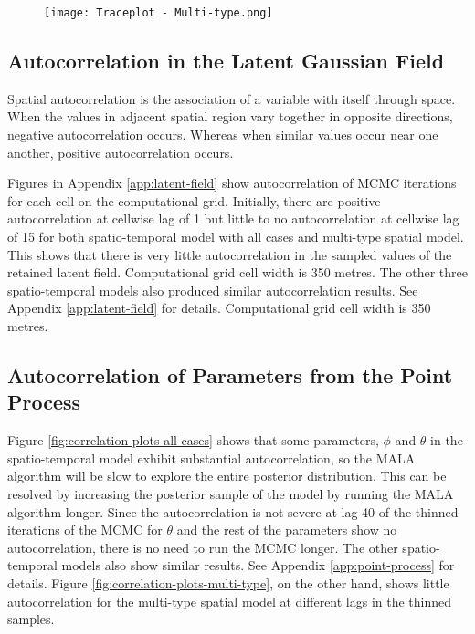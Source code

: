 \begin{figure}[H]
    \begin{center}
        \texttt{[image: Traceplot - Multi-type.png]}
    \end{center}
     \label{fig:trace-plots-multi-type}
\end{figure}

\subsection{Autocorrelation in the Latent Gaussian Field}

Spatial autocorrelation is the association of a variable with itself through space. When the values in adjacent spatial region vary together in opposite directions, negative autocorrelation occurs. Whereas when similar values occur near one another, positive autocorrelation occurs.

Figures in Appendix \ref{app:latent-field} show autocorrelation of MCMC iterations for each cell on the computational grid. Initially, there are positive autocorrelation at cellwise lag of 1 but little to no autocorrelation at cellwise lag of 15 for both spatio-temporal model with all cases and multi-type spatial model. This shows that there is very little autocorrelation in the sampled values of the retained latent field. Computational grid cell width is 350 metres. The other three spatio-temporal models also produced similar autocorrelation results. See Appendix \ref{app:latent-field} for details. Computational grid cell width is 350 metres.

\subsection{Autocorrelation of Parameters from the Point Process}

Figure \ref{fig:correlation-plots-all-cases} shows that some parameters, $\phi$ and $\theta$ in the spatio-temporal model exhibit substantial autocorrelation, so the MALA algorithm will be slow to explore the entire posterior distribution. This can be resolved by increasing the posterior sample of the model by running the MALA algorithm longer. Since the autocorrelation is not severe at lag 40 of the thinned iterations of the MCMC for $\theta$ and the rest of the parameters show no autocorrelation, there is no need to run the MCMC longer. The other spatio-temporal models also show similar results. See Appendix \ref{app:point-process} for details. Figure \ref{fig:correlation-plots-multi-type}, on the other hand, shows little autocorrelation for the multi-type spatial model at different lags in the thinned samples.

